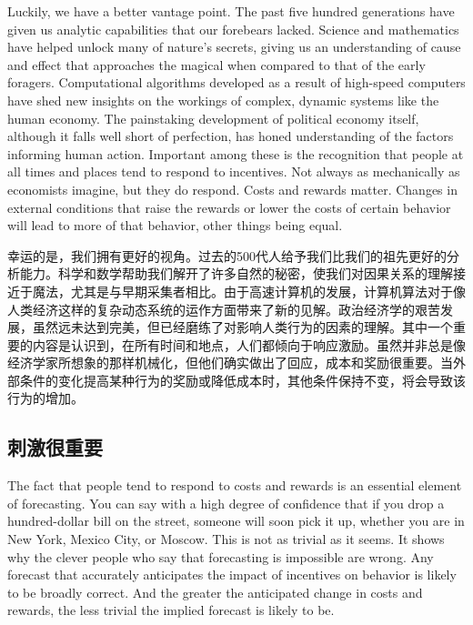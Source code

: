 \begin{Parallel}{97mm}{45mm}
  \ParallelLText
  {Luckily, we have a better vantage point. The past five hundred generations have given us analytic capabilities that our forebears lacked. Science and mathematics have helped unlock many of nature's secrets, giving us an understanding of cause and effect that approaches the magical when compared to that of the early foragers. Computational algorithms developed as a result of high-speed computers have shed new insights on the workings of complex, dynamic systems like the human economy. The painstaking development of political economy itself, although it falls well short of perfection, has honed understanding of the factors informing human action. Important among these is the recognition that people at all times and places tend to respond to incentives. Not always as mechanically as economists imagine, but they do respond. Costs and rewards matter. Changes in external conditions that raise the rewards or lower the costs of certain behavior will lead to more of that behavior, other things being equal.}
  
  \ParallelRText
  {幸运的是，我们拥有更好的视角。过去的500代人给予我们比我们的祖先更好的分析能力。科学和数学帮助我们解开了许多自然的秘密，使我们对因果关系的理解接近于魔法，尤其是与早期采集者相比。由于高速计算机的发展，计算机算法对于像人类经济这样的复杂动态系统的运作方面带来了新的见解。政治经济学的艰苦发展，虽然远未达到完美，但已经磨练了对影响人类行为的因素的理解。其中一个重要的内容是认识到，在所有时间和地点，人们都倾向于响应激励。虽然并非总是像经济学家所想象的那样机械化，但他们确实做出了回应，成本和奖励很重要。当外部条件的变化提高某种行为的奖励或降低成本时，其他条件保持不变，将会导致该行为的增加。}
  \ParallelPar

  \subsection{刺激很重要}

  \ParallelLText
  {The fact that people tend to respond to costs and rewards is an essential element of forecasting. You can say with a high degree of confidence that if you drop a hundred-dollar bill on the street, someone will soon pick it up, whether you are in New York, Mexico City, or Moscow. This is not as trivial as it seems. It shows why the clever people who say that forecasting is impossible are wrong. Any forecast that accurately anticipates the impact of incentives on behavior is likely to be broadly correct. And the greater the anticipated change in costs and rewards, the less trivial the implied forecast is likely to be.}
  

\end{Parallel}

